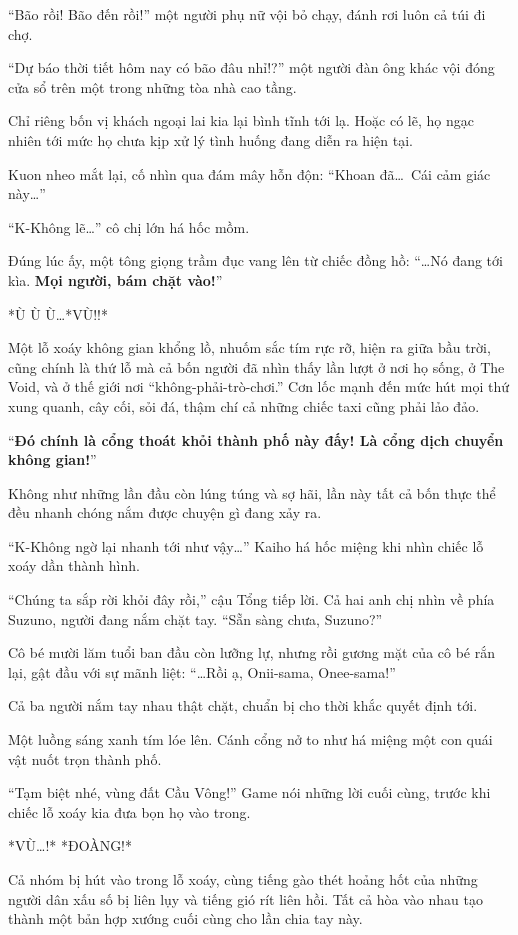 \documentclass[../main.tex]{subfiles}
\begin{document}
``Bão rồi! Bão đến rồi!'' một người phụ nữ vội bỏ chạy, đánh rơi luôn cả túi đi chợ.

``Dự báo thời tiết hôm nay có bão đâu nhỉ!?'' một người đàn ông khác vội đóng cửa sổ trên một trong những tòa nhà cao tầng.

Chỉ riêng bốn vị khách ngoại lai kia lại bình tĩnh tới lạ. Hoặc có lẽ, họ ngạc nhiên tới mức họ chưa kịp xử lý tình huống đang diễn ra hiện tại.

Kuon nheo mắt lại, cố nhìn qua đám mây hỗn độn: ``Khoan đã\dots\ Cái cảm giác này\dots''

``K-Không lẽ\dots'' cô chị lớn há hốc mồm.

Đúng lúc ấy, một tông giọng trầm đục vang lên từ chiếc đồng hồ: ``\dots Nó đang tới kìa. \textbf{Mọi người, bám chặt vào!}''

*Ù Ù Ù\dots* *VÙ!!*

Một lỗ xoáy không gian khổng lồ, nhuốm sắc tím rực rỡ, hiện ra giữa bầu trời, cũng chính là thứ lỗ mà cả bốn người đã nhìn thấy lần lượt ở nơi họ sống, ở The Void, và ở thế giới nơi ``không-phải-trò-chơi.'' Cơn lốc mạnh đến mức hút mọi thứ xung quanh, cây cối, sỏi đá, thậm chí cả những chiếc taxi cũng phải lảo đảo.

``\textbf{Đó chính là cổng thoát khỏi thành phố này đấy! Là cổng dịch chuyển không gian!}''

Không như những lần đầu còn lúng túng và sợ hãi, lần này tất cả bốn thực thể đều nhanh chóng nắm được chuyện gì đang xảy ra.

``K-Không ngờ lại nhanh tới như vậy\dots'' Kaiho há hốc miệng khi nhìn chiếc lỗ xoáy dần thành hình.

``Chúng ta sắp rời khỏi đây rồi,'' cậu Tổng tiếp lời. Cả hai anh chị nhìn về phía Suzuno, người đang nắm chặt tay. ``Sẵn sàng chưa, Suzuno?''

Cô bé mười lăm tuổi ban đầu còn lưỡng lự, nhưng rồi gương mặt của cô bé rắn lại, gật đầu với sự mãnh liệt: ``\dots Rồi ạ, Onii-sama, Onee-sama!''

Cả ba người nắm tay nhau thật chặt, chuẩn bị cho thời khắc quyết định tới.

Một luồng sáng xanh tím lóe lên. Cánh cổng nở to như há miệng một con quái vật nuốt trọn thành phố.

``Tạm biệt nhé, vùng đất Cầu Vông!'' Game nói những lời cuối cùng, trước khi chiếc lỗ xoáy kia đưa bọn họ vào trong.

*VÙ\dots!* *ĐOÀNG!*

Cả nhóm bị hút vào trong lỗ xoáy, cùng tiếng gào thét hoảng hốt của những người dân xấu số bị liên lụy và tiếng gió rít liên hồi. Tất cả hòa vào nhau tạo thành một bản hợp xướng cuối cùng cho lần chia tay này.
\end{document}
